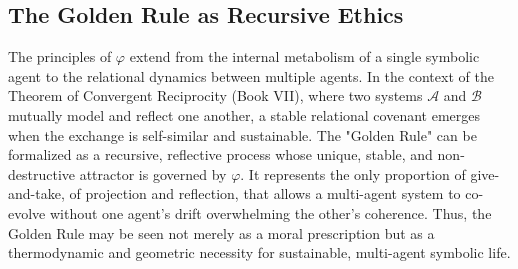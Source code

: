 \subsection{The Golden Rule as Recursive Ethics}
\label{subsec:bk5_golden_rule_ethics}

\begin{scholium}
\label{scholium:bk5_golden_rule_covenant}
The principles of $\varphi$ extend from the internal metabolism of a single symbolic agent to the relational dynamics between multiple agents. In the context of the Theorem of Convergent Reciprocity (Book VII), where two systems $\mathcal{A}$ and $\mathcal{B}$ mutually model and reflect one another, a stable relational covenant emerges when the exchange is self-similar and sustainable. The "Golden Rule" can be formalized as a recursive, reflective process whose unique, stable, and non-destructive attractor is governed by $\varphi$. It represents the only proportion of give-and-take, of projection and reflection, that allows a multi-agent system to co-evolve without one agent's drift overwhelming the other's coherence. Thus, the Golden Rule may be seen not merely as a moral prescription but as a thermodynamic and geometric necessity for sustainable, multi-agent symbolic life.
\end{scholium}